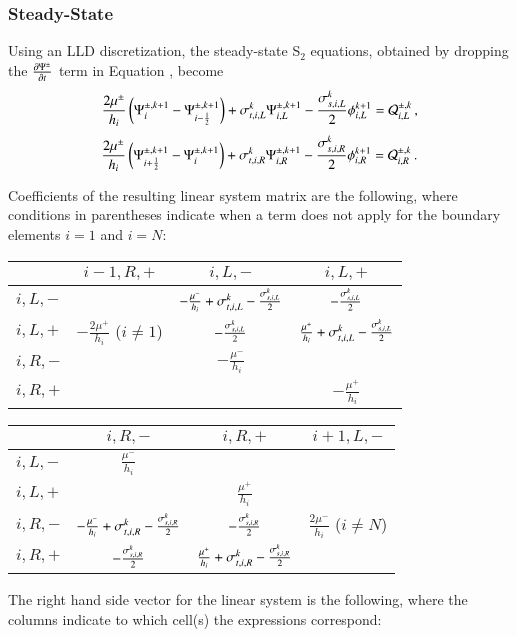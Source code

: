 \subsubsection{Steady-State}
Using an LLD discretization, the steady-state S$_2$ equations, obtained by
dropping the $\frac{\partial \Psi^\pm}{\partial t}$ term in Equation , become
\begin{equation}\lequ{S2ssL}
  \frac{2\mu^\pm}{h_i}\fn{\Psi^{\pm,k+1}_i - \Psi^{\pm,k+1}_{i-\half}}
  +\sigma_{t,i,L}^k\Psi\iL^{\pm,k+1}
  -\frac{\sigma_{s,i,L}^k}{2}\phi\iL^{k+1}
  =\Q_{i,L}^{\pm,k} \pec
\end{equation}
\begin{equation}\lequ{S2ssR}
  \frac{2\mu^\pm}{h_i}\fn{\Psi^{\pm,k+1}_{i+\half} - \Psi^{\pm,k+1}_i}
  +\sigma_{t,i,R}^k\Psi\iR^{\pm,k+1}
  -\frac{\sigma_{s,i,R}^k}{2}\phi\iR^{k+1}
  =\Q_{i,R}^{\pm,k} \pep
\end{equation}

Coefficients of the resulting linear system matrix are the following,
where conditions in parentheses indicate when a term does not
apply for the boundary elements $i=1$ and $i=N$:
\begin{center}
\begin{tabular}{|l||c|c|c|}\hline
          & $i-1,R,+$ & $i,L,-$ & $i,L,+$\\\hline\hline
  $i,L,-$ &
          & $-\frac{\mu^-}{h_i} + \sigma_{t,i,L}^k - \frac{\sigma_{s,i,L}^k}{2}$
          & $-\frac{\sigma_{s,i,L}^k}{2}$ \\\hline
  $i,L,+$ & $-\frac{2\mu^+}{h_i}$ ($i\ne 1$)
          & $-\frac{\sigma_{s,i,L}^k}{2}$
          & $\frac{\mu^+}{h_i} + \sigma_{t,i,L}^k - \frac{\sigma_{s,i,L}^k}{2}$ \\\hline
  $i,R,-$ &
          & $-\frac{\mu^-}{h_i}$
          & \\\hline
  $i,R,+$ &
          &
          & $-\frac{\mu^+}{h_i}$ \\\hline
\end{tabular}
\end{center}
\begin{center}
\begin{tabular}{|l||c|c|c|}\hline
          & $i,R,-$ & $i,R,+$ & $i+1,L,-$\\\hline\hline
  $i,L,-$ & $\frac{\mu^-}{h_i}$
          &
          & \\\hline
  $i,L,+$ &
          & $\frac{\mu^+}{h_i}$
          & \\\hline
  $i,R,-$ & $-\frac{\mu^-}{h_i} + \sigma_{t,i,R}^k - \frac{\sigma_{s,i,R}^k}{2}$
          & $-\frac{\sigma_{s,i,R}^k}{2}$
          & $\frac{2\mu^-}{h_i}$ ($i\ne N$) \\\hline
  $i,R,+$ & $-\frac{\sigma_{s,i,R}^k}{2}$
          & $\frac{\mu^+}{h_i} + \sigma_{t,i,R}^k - \frac{\sigma_{s,i,R}^k}{2}$
          & \\\hline
\end{tabular}
\end{center}
The right hand side vector for the linear system is the following,
where the columns indicate to which cell(s) the expressions
correspond:

